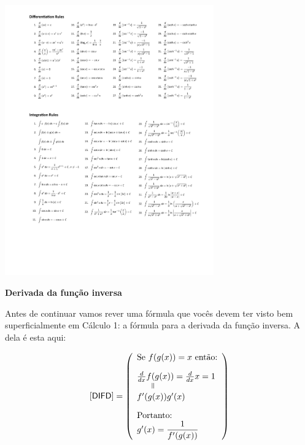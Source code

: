 \documentclass[oneside,12pt]{article}
\begin{document}
\includegraphics[width=9cm]{2020-2-C2/apex_calculus_table_of_integrals.pdf}


\newpage


{\bf Derivada da função inversa}

Antes de continuar vamos rever uma fórmula que vocês devem ter visto
bem superficialmente em Cálculo 1: a fórmula para a derivada da função
inversa. A  dela é esta aqui:

\def\DFID{
  \left(
  \begin{array}{l}
  \text{Se $f(g(x))=x$ então:} \\[10pt]
  \frac{d}{dx} f(g(x)) = \frac{d}{dx} x = 1 \\
  \phantom{mm}\veq \\
  f'(g(x))g'(x) \\[10pt]
  \text{Portanto:} \\
  g'(x) = \D \frac{1}{f'(g(x))} \\
  \end{array}
  \right)
  }

$$\pfo{DIFD} = \DFID
$$
\end{document}
